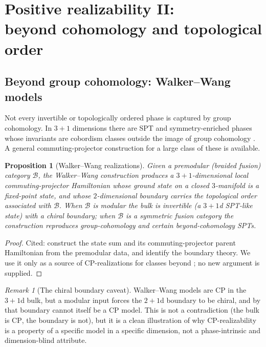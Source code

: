 \documentclass[12pt]{article}
\newcommand{\CP}{\mathrm{CP}}                    %
\newtheorem{proposition}[theorem]{Proposition}
\theoremstyle{definition}
\theoremstyle{remark}
\newtheorem{remark}[theorem]{Remark}
\begin{document}
\section[Positive realizability II: beyond cohomology and topological order]{Positive realizability II:\\ beyond cohomology and topological order}
\label{sec:beyond}

\subsection{Beyond group cohomology: Walker--Wang models}

Not every invertible or topologically ordered phase is captured by group cohomology. In
$3+1$ dimensions there are SPT and symmetry-enriched phases whose invariants are cobordism
classes outside the image of group cohomology \cite{kapustin-cobordism}. A general
commuting-projector construction for a large class of these is available.

\begin{proposition}[Walker--Wang realizations]
\label{prop:ww}
Given a premodular (braided fusion) category $\mathcal{B}$, the Walker--Wang construction
\cite{walker-wang} produces a $3+1$-dimensional local commuting-projector Hamiltonian whose
ground state on a closed $3$-manifold is a fixed-point state, and whose $2$-dimensional
boundary carries the topological order associated with $\mathcal{B}$. When $\mathcal{B}$ is
modular the bulk is invertible (a $3+1$d SPT-like state) with a chiral boundary; when
$\mathcal{B}$ is a symmetric fusion category the construction reproduces group-cohomology and
certain beyond-cohomology SPTs.
\end{proposition}

\begin{proof}
Cited: \cite{walker-wang} construct the state sum and its commuting-projector parent
Hamiltonian from the premodular data, and identify the boundary theory. We use it only as a
source of $\CP$-realizations for classes beyond ; no new argument is supplied.
\end{proof}

\begin{remark}[The chiral boundary caveat]
\label{rem:wwchiral}
Walker--Wang models are $\CP$ in the $3+1$d bulk, but a modular input forces the $2+1$d
boundary to be chiral, and by  that boundary cannot itself be a $\CP$ model.
This is not a contradiction (the bulk is $\CP$, the boundary is not), but it is a clean
illustration of why $\CP$-realizability is a property of a specific model in a specific
dimension, not a phase-intrinsic and dimension-blind attribute.
\end{remark}
\end{document}
